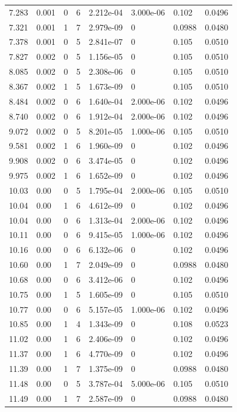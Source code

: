 \documentclass[preview]{standalone}
\begin{document}
{{\begin{tabular}{L{1.2cm}C{1.2cm} C{0.3cm}C{0.5cm} C{1.4cm}C{1.4cm} C{1.4cm}C{1.4cm}}
  7.283  &  0.001  & 0     &  6 &  2.212e-04  & 3.000e-06  & 0.102 &  0.0496   \\ 
  7.321  &  0.001  & 1     &  7 &  2.979e-09  & 0  & 0.0988 &  0.0480   \\ 
  7.378  &  0.001  & 0     &  5 &  2.841e-07  & 0  & 0.105 &  0.0510   \\ 
  7.827  &  0.002  & 0     &  5 &  1.156e-05  & 0  & 0.105 &  0.0510   \\ 
  8.085  &  0.002  & 0     &  5 &  2.308e-06  & 0  & 0.105 &  0.0510   \\ 
  8.367  &  0.002  & 1     &  5 &  1.673e-09  & 0  & 0.105 &  0.0510   \\ 
  8.484  &  0.002  & 0     &  6 &  1.640e-04  & 2.000e-06  & 0.102 &  0.0496   \\ 
  8.740  &  0.002  & 0     &  6 &  1.912e-04  & 2.000e-06  & 0.102 &  0.0496   \\ 
  9.072  &  0.002  & 0     &  5 &  8.201e-05  & 1.000e-06  & 0.105 &  0.0510   \\ 
  9.581  &  0.002  & 1     &  6 &  1.960e-09  & 0  & 0.102 &  0.0496   \\ 
  9.908  &  0.002  & 0     &  6 &  3.474e-05  & 0  & 0.102 &  0.0496   \\ 
  9.975  &  0.002  & 1     &  6 &  1.652e-09  & 0  & 0.102 &  0.0496   \\ 
  10.03  &  0.00  & 0     &  5 &  1.795e-04  & 2.000e-06  & 0.105 &  0.0510   \\ 
  10.04  &  0.00  & 1     &  6 &  4.612e-09  & 0  & 0.102 &  0.0496   \\ 
  10.04  &  0.00  & 0     &  6 &  1.313e-04  & 2.000e-06  & 0.102 &  0.0496   \\ 
  10.11  &  0.00  & 0     &  6 &  9.415e-05  & 1.000e-06  & 0.102 &  0.0496   \\ 
  10.16  &  0.00  & 0     &  6 &  6.132e-06  & 0  & 0.102 &  0.0496   \\ 
  10.60  &  0.00  & 1     &  7 &  2.049e-09  & 0  & 0.0988 &  0.0480   \\ 
  10.68  &  0.00  & 0     &  6 &  3.412e-06  & 0  & 0.102 &  0.0496   \\ 
  10.75  &  0.00  & 1     &  5 &  1.605e-09  & 0  & 0.105 &  0.0510   \\ 
  10.77  &  0.00  & 0     &  6 &  5.157e-05  & 1.000e-06  & 0.102 &  0.0496   \\ 
  10.85  &  0.00  & 1     &  4 &  1.343e-09  & 0  & 0.108 &  0.0523   \\ 
  11.02  &  0.00  & 1     &  6 &  2.406e-09  & 0  & 0.102 &  0.0496   \\ 
  11.37  &  0.00  & 1     &  6 &  4.770e-09  & 0  & 0.102 &  0.0496   \\ 
  11.39  &  0.00  & 1     &  7 &  1.375e-09  & 0  & 0.0988 &  0.0480   \\ 
  11.48  &  0.00  & 0     &  5 &  3.787e-04  & 5.000e-06  & 0.105 &  0.0510   \\ 
  11.49  &  0.00  & 1     &  7 &  2.587e-09  & 0  & 0.0988 &  0.0480   \\ 
\hline 
\end{tabular} 

}}
\end{document}
